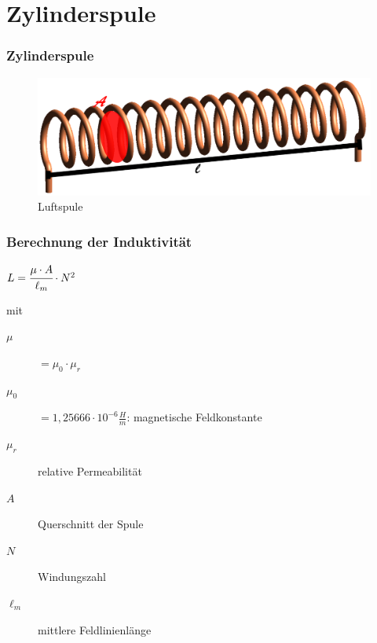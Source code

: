 \section*{Zylinderspule}

\begin{frame}
  \frametitle{Zylinderspule}
  \begin{center}
    \begin{figure}
      \includegraphics[width=1\textwidth]{e06/Luftspule.png}
      \caption{Luftspule}  %
    \end{figure}
  \end{center}
\end{frame}

\begin{frame}
  \frametitle{Berechnung der Induktivität}
  \begin{block}{}
    \begin{center}
      \huge{$L = \cfrac{\mu \cdot A}{\ell_m}\cdot N^2$}\\[1em]
      \small{mit
      \begin{description}
        \item[$\mu$] $= \mu_0 \cdot \mu_r$
        \item[$\mu_{0}$] $= 1,25666 \cdot 10^{-6}\frac{H}{m}$: magnetische Feldkonstante
        \item[$\mu_{r}$] relative Permeabilität
        \item[$A$] Querschnitt der Spule
        \item[$N$] Windungszahl
        \item[$\ell_{m}$] mittlere Feldlinienlänge
      \end{description}
      }
    \end{center}
  \end{block}
\end{frame}

